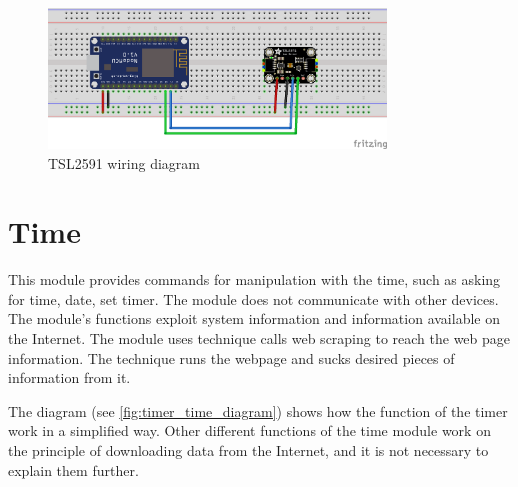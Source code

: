 \begin{figure}[H]
	\centering
	\includegraphics[width=0.8\textwidth]{img/tsl2591_schema.png}
	\caption{TSL2591 wiring diagram}
	\label{fig:tsl2591_schema}
\end{figure}
\newpage
\section{Time}

This module provides commands for manipulation with the time, such as asking for time, date, set timer. The module does not communicate with other devices. The module's functions exploit system information and information available on the Internet. The module uses technique calls web scraping to reach the web page information. The technique runs the webpage and sucks desired pieces of information from it.




The diagram (see \cref{fig:timer_time_diagram}) shows how the function of the timer work in a simplified way. Other different functions of the time module work on the principle of downloading data from the Internet, and it is not necessary to explain them further.

